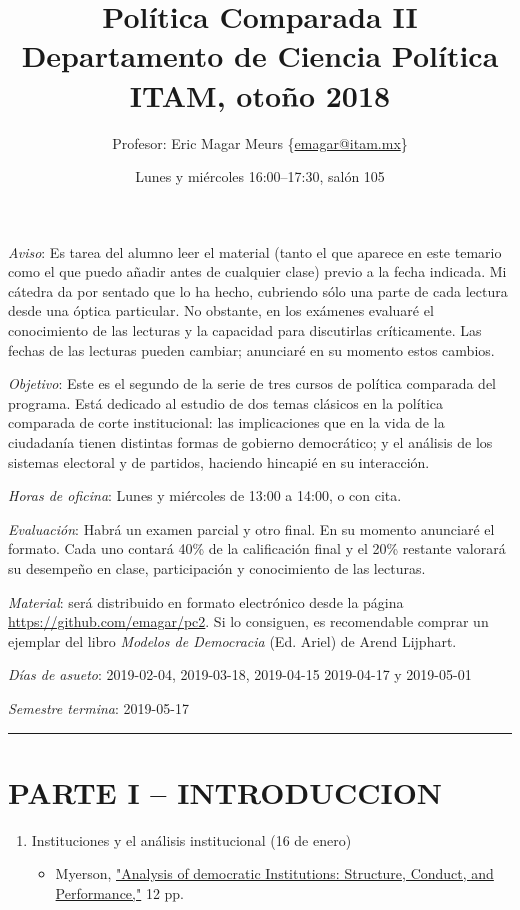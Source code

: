 \documentclass{article}
\author{Profesor: Eric Magar Meurs \small\{\url{emagar@itam.mx}\}}
\date{Lunes y miércoles 16:00--17:30, salón 105}
\title{Política Comparada II\\\medskip
\large Departamento de Ciencia Política ITAM, otoño 2018}
\begin{document}
\maketitle
\emph{Aviso}: Es tarea del alumno leer el material (tanto el que aparece en este temario como el que puedo añadir antes de cualquier clase) previo a la fecha indicada.  Mi cátedra da por sentado que lo ha hecho, cubriendo sólo una parte de cada lectura desde una óptica particular. No obstante, en los exámenes evaluaré el conocimiento de las lecturas y la capacidad para discutirlas críticamente. Las fechas de las lecturas pueden cambiar; anunciaré en su momento estos cambios.  

\emph{Objetivo}: Este es el segundo de la serie de tres cursos de política comparada del programa. Está dedicado al estudio de dos temas clásicos en la política comparada de corte institucional: las implicaciones que en la vida de la ciudadanía tienen distintas formas de gobierno democrático; y el análisis de los sistemas electoral y de partidos, haciendo hincapié en su interacción.  

\emph{Horas de oficina}: Lunes y miércoles de 13:00 a 14:00, o con cita. 

\emph{Evaluación}: Habrá un examen parcial y otro final. En su momento anunciaré el formato. Cada uno contará 40\% de la calificación final y el 20\% restante valorará su desempeño en clase, participación y conocimiento de las lecturas.

\emph{Material}: será distribuido en formato electrónico desde la página \url{https://github.com/emagar/pc2}. Si lo consiguen, es recomendable comprar un ejemplar del libro \emph{Modelos de Democracia} (Ed. Ariel) de Arend Lijphart. 

\emph{Días de asueto}: 2019-02-04, 2019-03-18, 2019-04-15 2019-04-17 y 2019-05-01

\emph{Semestre termina}: 2019-05-17

\noindent\rule{\textwidth}{0.5pt}

\section{PARTE I – INTRODUCCION}
\label{sec:org14e3fe9}
\begin{enumerate}
\item Instituciones y el análisis institucional  (16 de enero)
\label{sec:org31f4b78}
\begin{itemize}
\item Myerson, \href{https://github.com/emagar/pc2/blob/master/lecturas/myersonInstAnalysis1995jep.pdf}{"Analysis of democratic Institutions: Structure, Conduct, and Performance,"} 12 pp.
\end{itemize}
\end{enumerate}
\end{document}
